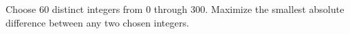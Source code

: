 Choose 60 distinct integers from 0 through 300. Maximize the smallest absolute difference between any two chosen integers.
